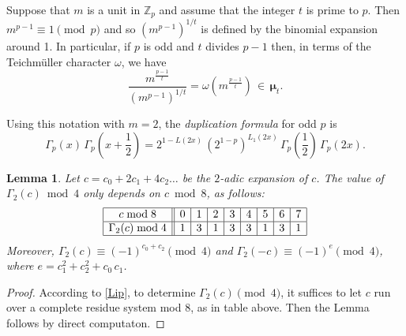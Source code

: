 \documentclass[12pt]{amsart}  \usepackage{amsmath,amssymb,enumerate,amscd,tikz,url}
\numberwithin{equation}{section}
\newtheorem{lemma}[equation]{Lemma}
\theoremstyle{definition}
\newcommand{\Z}{{\mathbb Z}}
\newcommand{\Mu}{\boldsymbol \mu}
\begin{document}
Suppose that $m$ is a unit in $\Z_p$ and assume that the integer $t$ is prime to $p$.  Then $m^{p-1} \equiv 1 \pmod{p}$ and so $\left(m^{p-1}\right)^{1/t}$ is defined by the binomial expansion around 1.  In particular, if $p$ is odd and $t$ divides $p-1$ then, in terms of the Teichm\"{u}ller character $\omega$, we have
\begin{equation*} 
\frac{m^{\frac{p-1}{t}}}{\left(m^{p-1}\right)^{1/t}} = \omega(m^{\frac{p-1}{t}}) \, \in \, \Mu_t.
\end{equation*} 

Using this notation with $m = 2$, the {\em duplication formula} for odd $p$ is
\begin{equation} \label{Dup}
\Gamma_p(x) \, \Gamma_p(x + {\textstyle \frac{1}{2}}) = 2^{1-L(2x)} \, \left(2^{1-p}\right)^{L_1(2x)} \, \Gamma_p\left({\textstyle \frac{1}{2}}  \right) \, \Gamma_p(2x).
\end{equation}

\begin{lemma}  \label{GammaMod4}
Let $c = c_0 + 2c_1 + 4c_2 \dots$ be the $2$-adic expansion of $c$.  The value of $\Gamma_2(c) \bmod{4}$ only depends on $c \bmod{8}$, as follows:
$$
\begin{array} {| c || r | r | r |  r | r | r |  r | r | }
\hline
c \bmod{8}  & 0 & 1  & 2 & 3 & 4 & 5 & 6 & 7  \\
\hline
\Gamma_2(c) \bmod{4} & 1 & 3 & 1 & 3 & 3 & 1 & 3 & 1 \\
\hline
\end{array}
$$
Moreover, $\Gamma_2(c) \equiv (-1)^{c_0+c_2} \pmod{4}$ and $\Gamma_2(-c) \equiv (-1)^e \pmod{4}$, where $e = c_1^2+c_2^2+c_0 \, c_1$.
\end{lemma}

\begin{proof}
According to \eqref{Lip}, to determine $\Gamma_2(c) \pmod{4}$, it suffices to let $c$ run over a complete residue system mod 8, as in table above.  Then the Lemma follows by direct computaton.
\end{proof}

\vspace{5 pt}
\end{document}
